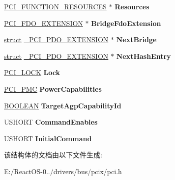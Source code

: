 \begin{DoxyCompactItemize}
\mbox{\label{struct___p_c_i___p_d_o___e_x_t_e_n_s_i_o_n_af1443cffabe58399391eee3c9bc096cb}} 
\hyperlink{struct___p_c_i___f_u_n_c_t_i_o_n___r_e_s_o_u_r_c_e_s}{P\+C\+I\+\_\+\+F\+U\+N\+C\+T\+I\+O\+N\+\_\+\+R\+E\+S\+O\+U\+R\+C\+ES} $\ast$ {\bfseries Resources}
\item 
\mbox{\label{struct___p_c_i___p_d_o___e_x_t_e_n_s_i_o_n_a04d3927d14950d884322bd11e27882c9}} 
\hyperlink{struct___p_c_i___f_d_o___e_x_t_e_n_s_i_o_n}{P\+C\+I\+\_\+\+F\+D\+O\+\_\+\+E\+X\+T\+E\+N\+S\+I\+ON} $\ast$ {\bfseries Bridge\+Fdo\+Extension}
\item 
\mbox{\label{struct___p_c_i___p_d_o___e_x_t_e_n_s_i_o_n_a8954aceafebcd50b42013d8f67cb2936}} 
\hyperlink{interfacestruct}{struct} \hyperlink{struct___p_c_i___p_d_o___e_x_t_e_n_s_i_o_n}{\+\_\+\+P\+C\+I\+\_\+\+P\+D\+O\+\_\+\+E\+X\+T\+E\+N\+S\+I\+ON} $\ast$ {\bfseries Next\+Bridge}
\item 
\mbox{\label{struct___p_c_i___p_d_o___e_x_t_e_n_s_i_o_n_a78208bfed3768dcf3ae3545adf8dfbf4}} 
\hyperlink{interfacestruct}{struct} \hyperlink{struct___p_c_i___p_d_o___e_x_t_e_n_s_i_o_n}{\+\_\+\+P\+C\+I\+\_\+\+P\+D\+O\+\_\+\+E\+X\+T\+E\+N\+S\+I\+ON} $\ast$ {\bfseries Next\+Hash\+Entry}
\item 
\mbox{\label{struct___p_c_i___p_d_o___e_x_t_e_n_s_i_o_n_aa3ee904c9aaef93502e34a575918e494}} 
\hyperlink{struct___p_c_i___l_o_c_k}{P\+C\+I\+\_\+\+L\+O\+CK} {\bfseries Lock}
\item 
\mbox{\label{struct___p_c_i___p_d_o___e_x_t_e_n_s_i_o_n_aeac01d7200f0ac0949351435c2c711fe}} 
\hyperlink{struct___p_c_i___p_m_c}{P\+C\+I\+\_\+\+P\+MC} {\bfseries Power\+Capabilities}
\item 
\mbox{\label{struct___p_c_i___p_d_o___e_x_t_e_n_s_i_o_n_ab7947078553936ff1df28892deb8c743}} 
\hyperlink{_processor_bind_8h_a112e3146cb38b6ee95e64d85842e380a}{B\+O\+O\+L\+E\+AN} {\bfseries Target\+Agp\+Capability\+Id}
\item 
\mbox{\label{struct___p_c_i___p_d_o___e_x_t_e_n_s_i_o_n_a596b9074b46a702911d9de35862a2662}} 
U\+S\+H\+O\+RT {\bfseries Command\+Enables}
\item 
\mbox{\label{struct___p_c_i___p_d_o___e_x_t_e_n_s_i_o_n_a997aaddc8d9dff97c03ccdec7657a87b}} 
U\+S\+H\+O\+RT {\bfseries Initial\+Command}
\end{DoxyCompactItemize}


该结构体的文档由以下文件生成\+:\begin{DoxyCompactItemize}
\item 
E\+:/\+React\+O\+S-\/0../drivers/bus/pcix/pci.\+h\end{DoxyCompactItemize}

